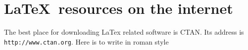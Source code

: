 \documentclass{article}
\begin{document}
\section{\textsf{\LaTeX\ resources on the internet }}
The best place for downloading LaTex related software is CTAN\@.
Its address is \texttt{http://www.ctan.org}.
Here is to write in \textrm{roman style}
\end{document}
